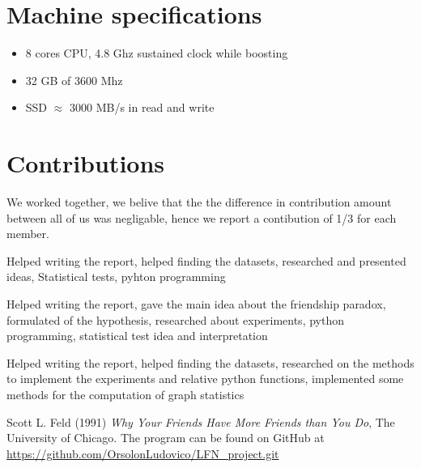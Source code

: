 \documentclass{article}
\begin{document}
\section{Machine specifications}
\begin{itemize}
    \item 8 cores CPU, 4.8 Ghz sustained clock while boosting
    \item 32 GB of 3600 Mhz 
    \item SSD $\approx$ 3000 MB/s in read and write
\end{itemize}
\section*{Contributions}
We worked together, we belive that the the difference in contribution amount between all of us was negligable, hence we report a contibution of 1/3 for each member.
\begin{description}[font=\normalfont\itshape]
    \item[Lavorati Ippolito:] Helped writing the report, helped finding the datasets, researched and presented ideas, Statistical tests, pyhton programming
    \item[Orsolon Ludovico:] Helped writing the report, gave the main idea about the friendship paradox, formulated of the hypothesis, researched about experiments, python programming, statistical test idea and interpretation
    \item[Stefani Patrizia:] Helped writing the report, helped finding the datasets, researched on the methods to implement the experiments and relative python functions, implemented some methods for the computation of graph statistics
\end{description}
\begin{thebibliography}{9}
Scott L. Feld (1991) \emph{Why Your Friends Have More Friends
than You Do}, The University of Chicago.
The program can be found on GitHub at \url{https://github.com/OrsolonLudovico/LFN_project.git}
\end{thebibliography}
\end{document}
